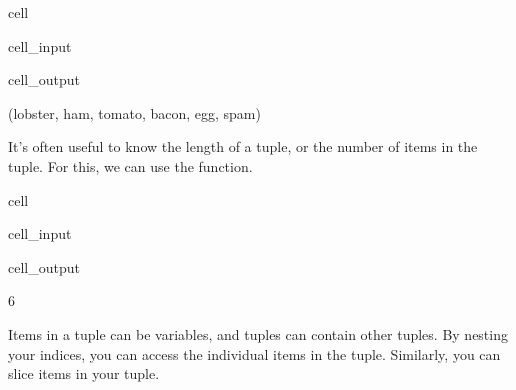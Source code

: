 \documentclass[letterpaper,10pt,english]{jupyterBook}
\begin{document}
\begin{sphinxuseclass}{cell}\begin{sphinxVerbatimInput}

\begin{sphinxuseclass}{cell_input}
\begin{sphinxVerbatim}[commandchars=\\\{\}]
\PYG{p}{[}\PYG{p}{]}
\end{sphinxVerbatim}

\end{sphinxuseclass}\end{sphinxVerbatimInput}
\begin{sphinxVerbatimOutput}

\begin{sphinxuseclass}{cell_output}
\begin{sphinxVerbatim}[commandchars=\\\{\}]
(\PYGZsq{}lobster\PYGZsq{}, \PYGZsq{}ham\PYGZsq{}, \PYGZsq{}tomato\PYGZsq{}, \PYGZsq{}bacon\PYGZsq{}, \PYGZsq{}egg\PYGZsq{}, \PYGZsq{}spam\PYGZsq{})
\end{sphinxVerbatim}

\end{sphinxuseclass}\end{sphinxVerbatimOutput}

\end{sphinxuseclass}
\sphinxAtStartPar
It’s often useful to know the length of a tuple, or the number of items in the tuple. For this, we can use the  function.

\begin{sphinxuseclass}{cell}\begin{sphinxVerbatimInput}

\begin{sphinxuseclass}{cell_input}
\begin{sphinxVerbatim}[commandchars=\\\{\}]
\end{sphinxVerbatim}

\end{sphinxuseclass}\end{sphinxVerbatimInput}
\begin{sphinxVerbatimOutput}

\begin{sphinxuseclass}{cell_output}
\begin{sphinxVerbatim}[commandchars=\\\{\}]
6
\end{sphinxVerbatim}

\end{sphinxuseclass}\end{sphinxVerbatimOutput}

\end{sphinxuseclass}
\sphinxAtStartPar
Items in a tuple can be variables, and tuples can contain other tuples. By nesting your indices, you can access the individual items in the  tuple. Similarly, you can slice items in your tuple.
\end{document}
